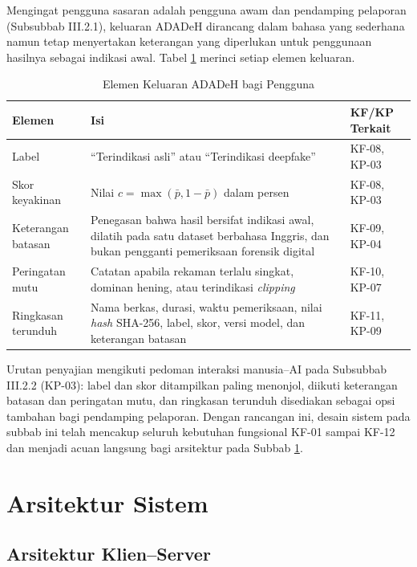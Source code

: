 Mengingat pengguna sasaran adalah pengguna awam dan pendamping pelaporan
(Subsubbab III.2.1), keluaran ADADeH dirancang dalam bahasa yang sederhana namun
tetap menyertakan keterangan yang diperlukan untuk penggunaan hasilnya sebagai
indikasi awal. Tabel \ref{tab:elemen-keluaran} merinci setiap elemen keluaran.

\begin{table}[htbp]
  \centering
  \caption{Elemen Keluaran ADADeH bagi Pengguna}
  \label{tab:elemen-keluaran}
  \begin{tabular}{@{}p{3.1cm}p{7.6cm}l@{}}
    \toprule
    \textbf{Elemen} & \textbf{Isi} & \textbf{KF/KP Terkait} \\
    \midrule
    Label & ``Terindikasi asli'' atau ``Terindikasi deepfake'' & KF-08, KP-03 \\
    Skor keyakinan & Nilai $c=\max(\bar{p},1-\bar{p})$ dalam persen & KF-08, KP-03 \\
    Keterangan batasan & Penegasan bahwa hasil bersifat indikasi awal, dilatih pada satu
    dataset berbahasa Inggris, dan bukan pengganti pemeriksaan forensik digital & KF-09,
    KP-04 \\
    Peringatan mutu & Catatan apabila rekaman terlalu singkat, dominan hening, atau
    terindikasi \textit{clipping} & KF-10, KP-07 \\
    Ringkasan terunduh & Nama berkas, durasi, waktu pemeriksaan, nilai \textit{hash}
    SHA-256, label, skor, versi model, dan keterangan batasan & KF-11, KP-09 \\
    \bottomrule
  \end{tabular}
\end{table}

Urutan penyajian mengikuti pedoman interaksi manusia--AI pada Subsubbab III.2.2
(KP-03): label dan skor ditampilkan paling menonjol, diikuti keterangan batasan dan
peringatan mutu, dan ringkasan terunduh disediakan sebagai opsi tambahan bagi
pendamping pelaporan. Dengan rancangan ini, desain sistem pada subbab ini telah
mencakup seluruh kebutuhan fungsional KF-01 sampai KF-12 dan menjadi acuan langsung
bagi arsitektur pada Subbab \ref{sec:arsitektur-sistem}.

\section{Arsitektur Sistem}
\label{sec:arsitektur-sistem}

\subsection{Arsitektur Klien--Server}
\label{subsec:arsitektur-klien-server}

